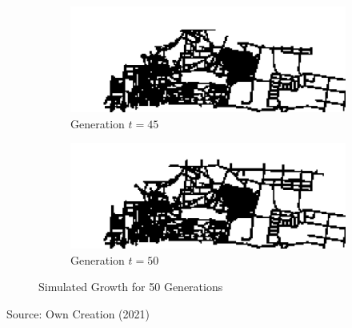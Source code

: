 \begin{figure}[H]
\begin{multicols}{2}
\begin{subfigure}{.5\textwidth}
  \centering
  \includegraphics[width=1\linewidth]{Figures/Chapter4/generation-45-melusi}
  \caption{Generation $t = 45$}
\end{subfigure}
\begin{subfigure}{.5\textwidth}
  \centering
  \includegraphics[width=1\linewidth]{Figures/Chapter4/generation-50-melusi}
  \caption{Generation $t = 50$}
\end{subfigure}
\end{multicols}

\caption{Simulated Growth for 50 Generations}
\label{fig:gen50}
\end{figure}
\begin{center}
Source: Own Creation (2021)
\end{center}